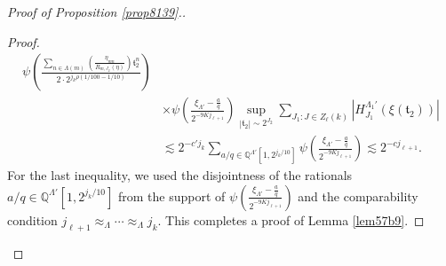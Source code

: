 \documentclass[11 pt,letterpaper]{amsart}
\theoremstyle{plain}
\theoremstyle{definition}
\theoremstyle{remark} \theoremstyle{exam} \theoremstyle{ob}
\numberwithin{equation}{section}
\begin{document}
\begin{proof}[Proof of Proposition \ref{prop8139}.]
\begin{proof}
\begin{align*}
		\psi\!\left(
		\frac{
			\sum_{n\in\Lambda(m)} \left(\frac{\eta_{mn}}{R_{m,J_2}(\eta)} \right)\mathfrak{t}_2^n
		}
		{ 2\cdot 2^{j_k\rho  (1/100-1/10)}}
		\right)\\
&\times \psi\left(\frac{\xi_{\Lambda'}-\frac{a}{q}}{2^{-9Kj_{\ell+1}}}\right)
		 \sup_{|\mathfrak{t}_2|\sim 2^{J_2}} \sum_{J_1:J\in Z_\ell(k)}\left| H^{\Lambda_{1}'}_{J_{1}}\left(\xi(\mathfrak{t}_2) \right)\right|
		 \\
		& \lesssim 2^{-c'j_k}\sum_{ a/q\in \mathbb{Q}^{\Lambda'}[1,2^{j_k/10}]}\psi\left(\frac{\xi_{\Lambda'}-\frac{a}{q}}{2^{-9Kj_{\ell+1}}}\right)\lesssim 2^{-cj_{\ell+1}}. \nonumber
	\end{align*}
For the last inequality, we used the disjointness of the rationals
\( a/q\in \mathbb{Q}^{\Lambda'}[1,2^{j_k/10}] \)
from the support of
\( \psi\!\left(\frac{\xi_{\Lambda'}-\frac{a}{q}}{2^{-9Kj_{\ell+1}}}\right) \) and the comparability condition
\( j_{\ell+1}\approx_{\Lambda}\cdots \approx_{\Lambda} j_{k} \).
	This completes a proof of Lemma \ref{lem57b9}.\end{proof}
 


\end{proof}
\end{document}
